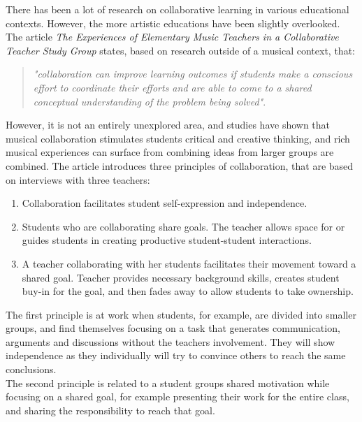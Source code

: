 There has been a lot of research on collaborative learning in various educational contexts. However, the more artistic educations have been slightly overlooked\cite{collaborativeLearningTeachers}\cite{collaborativeMusicAnalysis}\cite{collaborativeLearningReview}. 
The article \textit{The Experiences of Elementary Music Teachers in a Collaborative Teacher Study Group} states, based on research outside of a musical context, that:\\
	\begin{quote}
		\textit{"collaboration can improve learning outcomes if students make a conscious effort to coordinate their efforts and are able to come to a shared conceptual understanding of the problem being solved"}\cite{collaborativeLearningTeachers}.\\
	\end{quote}

	However, it is not an entirely unexplored area, and studies have shown that musical collaboration stimulates students critical and creative thinking, and rich musical experiences can surface from combining ideas from larger groups are combined\cite{collaborativeLearningTeachers}. 
	The article introduces three principles of collaboration, that are based on interviews with three teachers:\\
	\begin{enumerate}
		\item Collaboration facilitates student self-expression and independence.
		\item Students who are collaborating share goals. The teacher allows space for or guides students in creating productive student-student interactions.
		\item A teacher collaborating with her students facilitates their movement toward a shared goal. Teacher provides necessary background skills, creates student buy-in for the goal, and then fades away to allow students to take ownership.\\
	\end{enumerate}

	The first principle is at work when students, for example, are divided into smaller groups, and find themselves focusing on a task that generates communication, arguments and discussions without the teachers involvement. They will show independence as they individually will try to convince others to reach the same conclusions.\\
	
	The second principle is related to a student groups shared motivation while focusing on a shared goal, for example presenting their work for the entire class, and sharing the responsibility to reach that goal.\\
	
